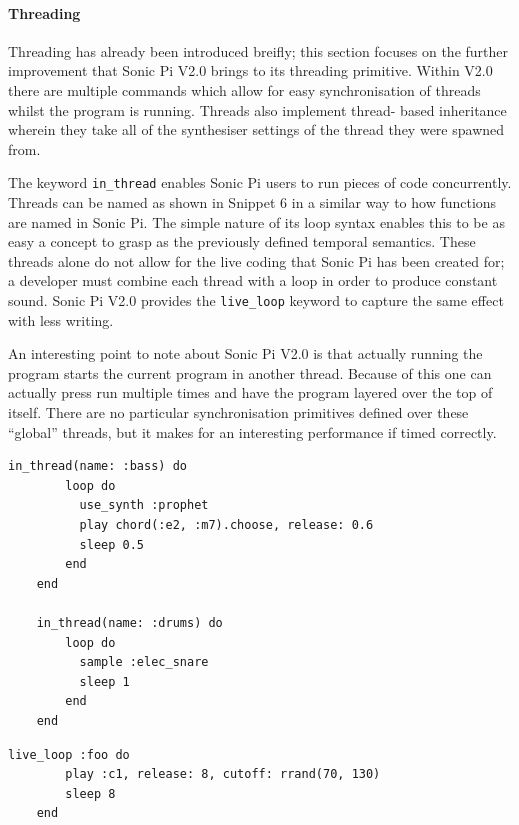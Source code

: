 \documentclass[11pt, abstracton, twoside, titlepage=true]{scrartcl}
\begin{document}
\paragraph{Threading}

Threading has already been introduced breifly; this section focuses on the 
further improvement that Sonic Pi V2.0 brings to its threading primitive. 
Within V2.0 there are multiple commands which allow for easy synchronisation 
of threads whilst the program is running. Threads also implement thread-
based inheritance wherein they take all of the synthesiser settings of the 
thread they were spawned from.

The keyword \texttt{in\_thread} enables Sonic Pi users to run pieces of 
code concurrently. Threads can be named as shown in Snippet 6 in a similar way 
to how functions are named in Sonic Pi. The simple nature of its loop syntax 
enables this to be as easy a concept to grasp as the previously defined 
temporal semantics. These threads alone do not allow for the live coding that 
Sonic Pi has been created for; a developer must combine each thread with a loop
in order to produce constant sound. Sonic Pi V2.0 provides the \texttt{live\_loop}
keyword to capture the same effect with less writing.

An interesting point to note about Sonic Pi V2.0 is that actually running the 
program starts the current program in another thread. Because of this one can 
actually press run multiple times and have the program layered over the top of 
itself. There are no particular synchronisation primitives defined over these 
``global'' threads, but it makes for an interesting performance if timed 
correctly.

\begin{minipage}{\textwidth}
	\begin{lstlisting}[style = sonicpi]
    in_thread(name: :bass) do
        loop do
          use_synth :prophet
          play chord(:e2, :m7).choose, release: 0.6
          sleep 0.5
        end
    end

    in_thread(name: :drums) do
        loop do
          sample :elec_snare
          sleep 1
        end
    end
	\end{lstlisting}
\end{minipage}

\begin{minipage}{\textwidth}
	\begin{lstlisting}[style = sonicpi]
    live_loop :foo do
        play :c1, release: 8, cutoff: rrand(70, 130)
        sleep 8
    end
	\end{lstlisting}
\end{minipage}
\end{document}
